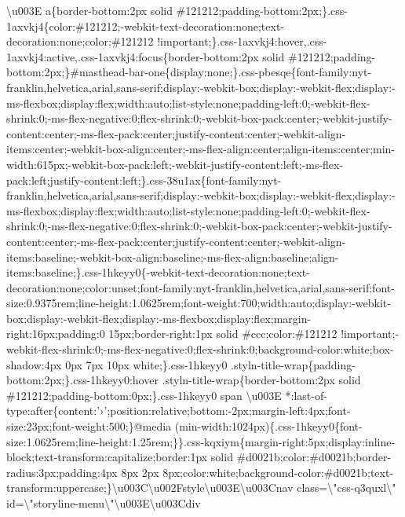 \textbackslash{}u003E a\{border-bottom:2px solid
\#121212;padding-bottom:2px;\}.css-1axvkj4\{color:\#121212;-webkit-text-decoration:none;text-decoration:none;color:\#121212
!important;\}.css-1axvkj4:hover,.css-1axvkj4:active,.css-1axvkj4:focus\{border-bottom:2px
solid
\#121212;padding-bottom:2px;\}\#masthead-bar-one\{display:none;\}.css-pbesqe\{font-family:nyt-franklin,helvetica,arial,sans-serif;display:-webkit-box;display:-webkit-flex;display:-ms-flexbox;display:flex;width:auto;list-style:none;padding-left:0;-webkit-flex-shrink:0;-ms-flex-negative:0;flex-shrink:0;-webkit-box-pack:center;-webkit-justify-content:center;-ms-flex-pack:center;justify-content:center;-webkit-align-items:center;-webkit-box-align:center;-ms-flex-align:center;align-items:center;min-width:615px;-webkit-box-pack:left;-webkit-justify-content:left;-ms-flex-pack:left;justify-content:left;\}.css-38u1ax\{font-family:nyt-franklin,helvetica,arial,sans-serif;display:-webkit-box;display:-webkit-flex;display:-ms-flexbox;display:flex;width:auto;list-style:none;padding-left:0;-webkit-flex-shrink:0;-ms-flex-negative:0;flex-shrink:0;-webkit-box-pack:center;-webkit-justify-content:center;-ms-flex-pack:center;justify-content:center;-webkit-align-items:baseline;-webkit-box-align:baseline;-ms-flex-align:baseline;align-items:baseline;\}.css-1hkeyy0\{-webkit-text-decoration:none;text-decoration:none;color:unset;font-family:nyt-franklin,helvetica,arial,sans-serif;font-size:0.9375rem;line-height:1.0625rem;font-weight:700;width:auto;display:-webkit-box;display:-webkit-flex;display:-ms-flexbox;display:flex;margin-right:16px;padding:0
15px;border-right:1px solid \#ccc;color:\#121212
!important;-webkit-flex-shrink:0;-ms-flex-negative:0;flex-shrink:0;background-color:white;box-shadow:4px
0px 7px 10px white;\}.css-1hkeyy0
.styln-title-wrap\{padding-bottom:2px;\}.css-1hkeyy0:hover
.styln-title-wrap\{border-bottom:2px solid
\#121212;padding-bottom:0px;\}.css-1hkeyy0 span \textbackslash{}u003E
*:last-of-type:after\{content:'›';position:relative;bottom:-2px;margin-left:4px;font-size:23px;font-weight:500;\}@media
(min-width:1024px)\{.css-1hkeyy0\{font-size:1.0625rem;line-height:1.25rem;\}\}.css-kqxiym\{margin-right:5px;display:inline-block;text-transform:capitalize;border:1px
solid \#d0021b;color:\#d0021b;border-radius:3px;padding:4px 8px 2px
8px;color:white;background-color:\#d0021b;text-transform:uppercase;\}\textbackslash{}u003C\textbackslash{}u002Fstyle\textbackslash{}u003E\textbackslash{}u003Cnav
class=\textbackslash{}"css-q3quxl\textbackslash{}"
id=\textbackslash{}"storyline-menu\textbackslash{}"\textbackslash{}u003E\textbackslash{}u003Cdiv
